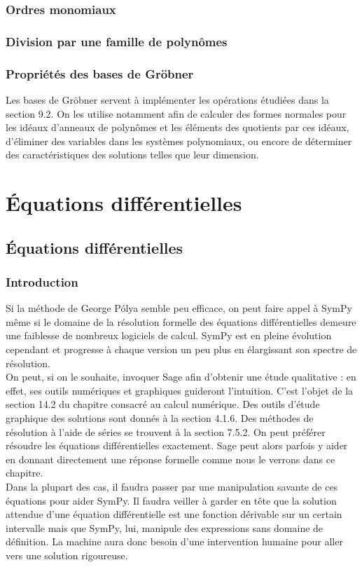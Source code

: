 \subsection{Ordres monomiaux}
\subsection{ Division par une famille de polynômes}
\subsection{ Propriétés des bases de Gröbner}
Les bases de Gröbner servent à implémenter les opérations étudiées dans la section 9.2. On les utilise notamment 
afin de calculer des formes normales pour les idéaux d’anneaux de polynômes et les éléments des quotients par 
ces idéaux, d’éliminer des variables dans les systèmes polynomiaux, ou encore de déterminer
des caractéristiques des solutions telles que leur dimension.
\chapter{Équations différentielles}
 \section{Équations différentielles}
 \subsection{Introduction}
Si la méthode de George Pólya semble peu efficace, on peut faire appel à SymPy même si le domaine de la résolution formelle des équations différentielles demeure une faiblesse de nombreux logiciels de calcul. SymPy est en pleine évolution cependant et progresse à chaque version un peu plus en élargissant son spectre de
résolution.
\\
On peut, si on le souhaite, invoquer Sage afin d’obtenir une étude qualitative :
en effet, ses outils numériques et graphiques guideront l’intuition. C’est l’objet
de la section 14.2 du chapitre consacré au calcul numérique. Des outils d’étude
graphique des solutions sont donnés à la section 4.1.6. Des méthodes de résolution
à l’aide de séries se trouvent à la section 7.5.2.
On peut préférer résoudre les équations différentielles exactement. Sage peut
alors parfois y aider en donnant directement une réponse formelle comme nous le
verrons dans ce chapitre.
\\
Dans la plupart des cas, il faudra passer par une manipulation savante de
ces équations pour aider SymPy. Il faudra veiller à garder en tête que la solution
attendue d’une équation différentielle est une fonction dérivable sur un certain
intervalle mais que SymPy, lui, manipule des expressions sans domaine de définition.
La machine aura donc besoin d’une intervention humaine pour aller vers une
solution rigoureuse.
\\ 


